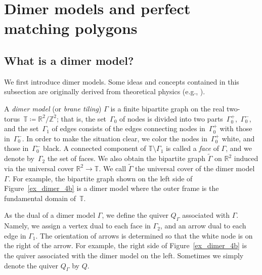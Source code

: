 \documentclass[pdftex]{sigma}%
\numberwithin{equation}{section}
\numberwithin{figure}{section}
\numberwithin{table}{section}
\newcommand{\ZZ}{\mathbb{Z}}
\newcommand{\RR}{\mathbb{R}}
\newcommand{\TT}{\mathbb{T}}
\begin{document}
\section{Dimer models and perfect matching polygons}\label{sec_pre_dimer}

\subsection{What is a dimer model?}
We first introduce dimer models. Some ideas and concepts contained in this subsection are originally derived from theoretical physics (e.g., \cite{FHK,HV}).

A \emph{dimer model} (or \emph{brane tiling}) $\Gamma$ is a finite bipartite graph on the real two-torus~$\TT\coloneqq\RR^2/\ZZ^2$; that is, the set~$\Gamma_0$ of nodes is divided into two parts~$\Gamma_0^+$,~$\Gamma_0^-$, and the set~$\Gamma_1$ of edges consists of the edges connecting nodes in~$\Gamma_0^+$ with those in~$\Gamma_0^-$.
In order to make the situation clear, we color the nodes in~$\Gamma_0^+$ white, and those in~$\Gamma_0^-$ black.
A connected component of $\TT{\setminus}\Gamma_1$ is called a \emph{face} of $\Gamma$, and we denote by~$\Gamma_2$ the set of faces.
We also obtain the bipartite graph $\widetilde{\Gamma}$ on $\RR^2$ induced via the universal cover $\RR^2\rightarrow\TT$.
We call $\widetilde{\Gamma}$ the universal cover of the dimer model~$\Gamma$.
For example, the bipartite graph shown on the left side of Figure~\ref{ex_dimer_4b} is a dimer model
where the outer frame is the fundamental domain of~$\TT$.

As the dual of a dimer model $\Gamma$, we define the quiver $Q_\Gamma$ associated with $\Gamma$.
Namely, we assign a vertex dual to each face in $\Gamma_2$, and an arrow dual to each edge in $\Gamma_1$.
The orientation of arrows is determined so that the white node is on the right of the arrow.
For example, the right side of Figure~\ref{ex_dimer_4b} is the quiver associated with the dimer model on the left.
Sometimes we simply denote the quiver $Q_\Gamma$ by $Q$.

\newcommand{\basicdimerB}{
\coordinate (W1) at (5,1); \coordinate (W2) at (1,3); \coordinate (W3) at (3,5);
\coordinate (B1) at (3,1); \coordinate (B2) at (1,5); \coordinate (B3) at (5,3);
\draw[line width=\edgewidth] (0,0) rectangle (6,6);
\draw[line width=\edgewidth] (W2)--(B1)--(W1)--(B3)--(W3)--(B2)--(W2); \draw[line width=\edgewidth] (B1)--(W3);
\draw[line width=\edgewidth] (0,3)--(W2); \draw[line width=\edgewidth] (3,0)--(B1); \draw[line width=\edgewidth] (6,0)--(W1);
\draw[line width=\edgewidth] (6,3)--(B3); \draw[line width=\edgewidth] (3,6)--(W3); \draw[line width=\edgewidth] (0,6)--(B2);
\draw [line width=\nodewidth, fill=black] (B1) circle [radius=\noderad] ;
\draw [line width=\nodewidth, fill=black] (B2) circle [radius=\noderad] ;
\draw [line width=\nodewidth, fill=black] (B3) circle [radius=\noderad] ;
\draw [line width=\nodewidth, fill=white] (W1) circle [radius=\noderad] ;
\draw [line width=\nodewidth, fill=white] (W2) circle [radius=\noderad] ;
\draw [line width=\nodewidth, fill=white] (W3) circle [radius=\noderad] ;
}
\end{document}
